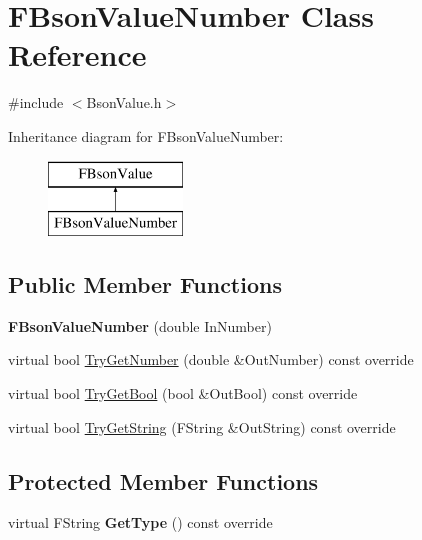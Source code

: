 \hypertarget{class_f_bson_value_number}{}\section{F\+Bson\+Value\+Number Class Reference}
\label{class_f_bson_value_number}


{\ttfamily \#include $<$Bson\+Value.\+h$>$}

Inheritance diagram for F\+Bson\+Value\+Number\+:\begin{figure}[H]
\begin{center}
\leavevmode
\includegraphics[height=2.000000cm]{class_f_bson_value_number}
\end{center}
\end{figure}
\subsection*{Public Member Functions}
\begin{DoxyCompactItemize}
\item 
\mbox{\label{class_f_bson_value_number_a455bbd7ddd29d2dddacfa5d479bbd6c7}} 
{\bfseries F\+Bson\+Value\+Number} (double In\+Number)
\item 
virtual bool \mbox{\hyperlink{class_f_bson_value_number_a6e5788ee9637c76e073c6336f1b3d263}{Try\+Get\+Number}} (double \&Out\+Number) const override
\item 
virtual bool \mbox{\hyperlink{class_f_bson_value_number_af85e6c473afae0cb5340499ab013cf4f}{Try\+Get\+Bool}} (bool \&Out\+Bool) const override
\item 
virtual bool \mbox{\hyperlink{class_f_bson_value_number_a7a8298e9a37d8d93f5b37319665e6735}{Try\+Get\+String}} (F\+String \&Out\+String) const override
\end{DoxyCompactItemize}
\subsection*{Protected Member Functions}
\begin{DoxyCompactItemize}
\item 
\mbox{\label{class_f_bson_value_number_a4efd450f2e77f179f682e809ff8313e5}} 
virtual F\+String {\bfseries Get\+Type} () const override
\end{DoxyCompactItemize}

